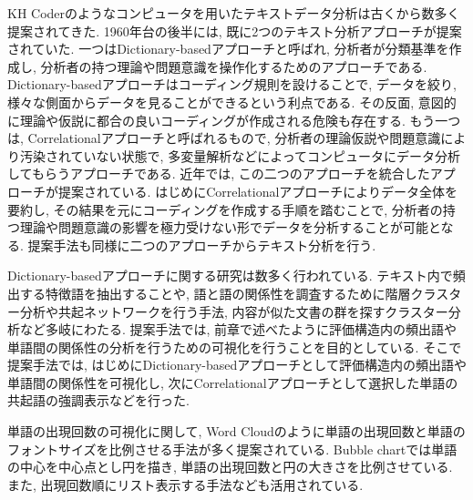 \documentclass[syuuron]{kuee}
\begin{document}
		KH Coderのようなコンピュータを用いたテキストデータ分析は古くから数多く提案されてきた. 
		1960年台の後半には, 既に2つのテキスト分析アプローチが提案されていた. 
		一つはDictionary-basedアプローチと呼ばれ, 分析者が分類基準を作成し, 
		分析者の持つ理論や問題意識を操作化するためのアプローチである\cite{kh3}. 
		Dictionary-basedアプローチはコーディング規則を設けることで, データを絞り, 様々な側面からデータを見ることができるという利点である. 
		その反面, 意図的に理論や仮説に都合の良いコーディングが作成される危険も存在する. 
		もう一つは, Correlationalアプローチと呼ばれるもので, 分析者の理論仮説や問題意識により汚染されていない状態で, 
		多変量解析などによってコンピュータにデータ分析してもらうアプローチである. 
		近年では, この二つのアプローチを統合したアプローチが提案されている\cite{kh1, kh2}. 
		はじめにCorrelationalアプローチによりデータ全体を要約し, その結果を元にコーディングを作成する手順を踏むことで, 
		分析者の持つ理論や問題意識の影響を極力受けない形でデータを分析することが可能となる. 
		提案手法も同様に二つのアプローチからテキスト分析を行う. 
		
		Dictionary-basedアプローチに関する研究は数多く行われている. 
		テキスト内で頻出する特徴語を抽出することや, 語と語の関係性を調査するために階層クラスター分析や共起ネットワークを行う手法, 
		内容が似た文書の群を探すクラスター分析など多岐にわたる. 
		提案手法では, 前章で述べたように評価構造内の頻出語や単語間の関係性の分析を行うための可視化を行うことを目的としている. 
		そこで提案手法では, はじめにDictionary-basedアプローチとして評価構造内の頻出語や単語間の関係性を可視化し, 
		次にCorrelationalアプローチとして選択した単語の共起語の強調表示などを行った. 
		
		単語の出現回数の可視化に関して, Word Cloudのように単語の出現回数と単語のフォントサイズを比例させる手法が多く提案されている\cite{wc1}. 
		Bubble chartでは単語の中心を中心点とし円を描き, 単語の出現回数と円の大きさを比例させている. 
		また, 出現回数順にリスト表示する手法なども活用されている. 
		
\end{document}
